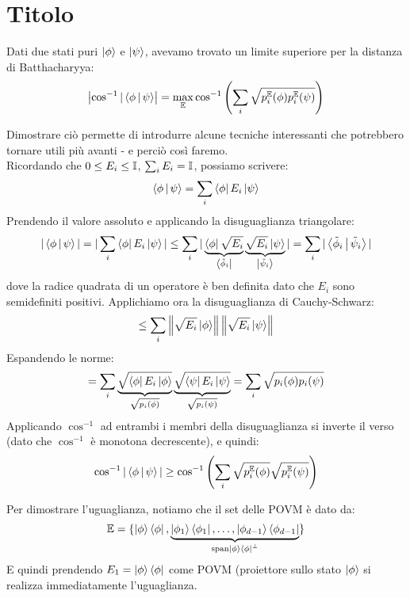 \documentclass[../../InformazioneQuantistica.tex]{subfiles}
\begin{document}
\section{Titolo}

Dati due stati puri $\Ket{\phi}$ e $\Ket{\psi}$, avevamo trovato un limite superiore per la distanza di Batthacharyya:
\begin{align*}
\left|\cos^{-1}|\Braket{\phi|\psi} \right| = \max_{\mathbb{E}} \cos^{-1}\left( \sum_i \sqrt{p_i^{\mathbb{E}}(\phi) p_i^{\mathbb{E}}(\psi)} \right)
\end{align*}

Dimostrare ciò permette di introdurre alcune tecniche interessanti che potrebbero tornare utili più avanti - e perciò così faremo.\\

Ricordando che $0 \leq E_i \leq \mathbb{I}$, $\sum_i E_i = \mathbb{I}$, possiamo scrivere:
\begin{align*}
\Braket{\phi|\psi} = \sum_i \Bra{\phi}E_i \Ket{\psi}
\end{align*}
Prendendo il valore assoluto e applicando la disuguaglianza triangolare:
\begin{align*}
|\Braket{\phi|\psi}| = |\sum_i \Bra{\phi}E_i \Ket{\psi}| \leq \sum_i |\underbrace{\Bra{\phi}\sqrt{E_i}}_{\Bra{\tilde{\phi}_i}}\underbrace{\sqrt{E_i} \Ket{\psi}}_{\Ket{\tilde{\psi}_i}}| = \sum_i |\Braket{\tilde{\phi}_i|\tilde{\psi}_i}|
\end{align*}
dove la radice quadrata di un operatore è ben definita dato che $E_i$ sono semidefiniti positivi. Applichiamo ora la disuguaglianza di Cauchy-Schwarz:
\begin{align*}
\leq \sum_i \left\lVert\sqrt{E_i}\Ket{\phi}\right\rVert \left\lVert\sqrt{E_i} \Ket{\psi}\right\rVert
\end{align*}
Espandendo le norme:
\begin{align*}
= \sum_i \underbrace{\sqrt{ \Bra{\phi}E_i \Ket{\phi}}}_{\sqrt{p_i(\phi)}}\underbrace{\sqrt{\Bra{\psi}E_i \Ket{\psi}}}_{\sqrt{p_i(\psi)}} = \sum_i \sqrt{p_i(\phi) p_i(\psi)}
\end{align*}
Applicando $\cos^{-1}$ ad entrambi i membri della disuguaglianza si inverte il verso (dato che $\cos^{-1}$ è monotona decrescente), e quindi:
\begin{align*}
\cos^{-1}|\Braket{\phi|\psi}| \geq \cos^{-1}\left( \sum_i \sqrt{p_i^{\mathbb{E}}(\phi)} \sqrt{p_i^{\mathbb{E}}(\psi)} \right)
\end{align*}

Per dimostrare l'uguaglianza, notiamo che il set delle POVM è dato da:
\begin{align*}
\mathbb{E} = \{ \Ket{\phi}\Bra{\phi}, \underbrace{\Ket{\phi_1}\Bra{\phi_1}, \dots, \Ket{\phi_{d-1}}\Bra{\phi_{d-1}}}_{\mathrm{span } \Ket{\phi}\Bra{\phi}^\perp} \}
\end{align*}
E quindi prendendo $E_1 = \Ket{\phi}\Bra{\phi}$ come POVM (proiettore sullo stato $\Ket{\phi}$ si realizza immediatamente l'uguaglianza.
\end{document}
